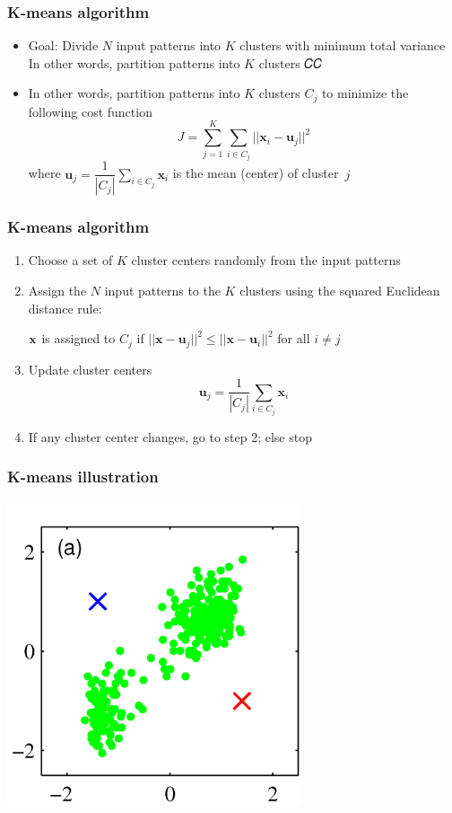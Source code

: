 \documentclass[12pt,notes,mathserif]{beamer}
\begin{document}
\begin{frame}[c]
	\frametitle{K-means algorithm}
	\begin{itemize}
		\item Goal: Divide $N$ input patterns into $K$ clusters with minimum total variance In other words, partition patterns into $K$ clusters 𝐶𝐶
		\item In other words, partition patterns into $K$ clusters $C_j$ to minimize the following cost function
		      \[
			      J=\sum_{j=1}^K\sum_{i\in C_j} ||\mathbf{x}_i-\mathbf{u}_j||^2
		      \]
		      where $\mathbf{u}_j=\dfrac{1}{|C_j|}\sum_{i\in C_j}\mathbf{x}_i$ is  the mean (center) of cluster~$j$
	\end{itemize}
\end{frame}

\begin{frame}[c]
	\frametitle{K-means algorithm}
	\begin{enumerate}
		\item Choose a set of $K$ cluster centers randomly from the input patterns
		\item Assign the $N$ input patterns to the $K$ clusters using the squared Euclidean distance rule:

		      $\mathbf{x}$ is assigned to $C_j$ if $||\mathbf{x}-\mathbf{u}_j||^2\le ||\mathbf{x}-\mathbf{u}_i||^2$ for all $i\neq j$
		\item Update cluster centers
		      \[
			      \mathbf{u}_j=\frac{1}{|C_j|}\sum_{i\in C_j}\mathbf{x}_i
		      \]
		\item If any cluster center changes, go to step 2; else stop
	\end{enumerate}
\end{frame}



\begin{frame}[c]
	\frametitle{K-means illustration}
	\begin{center}
		\includegraphics[width=0.65\textwidth]{fig/lec718.jpg}
	\end{center}
\end{frame}
\end{document}
